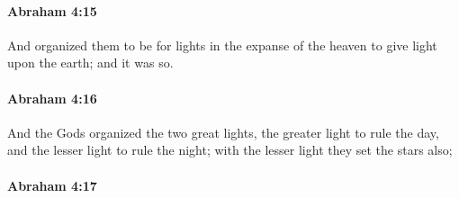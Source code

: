 		\paragraph{Abraham 4:15} %
			\label{ABRAHAM-4-15}

			And organized them to be for lights in the expanse of the heaven to give light upon the earth; and it was so.


		\paragraph{Abraham 4:16} %
			\label{ABRAHAM-4-16}

			And the Gods organized the two great lights, the greater light to rule the day, and the lesser light to rule the night; with the lesser light they set the stars also;


		\paragraph{Abraham 4:17} %
			\label{ABRAHAM-4-17}


